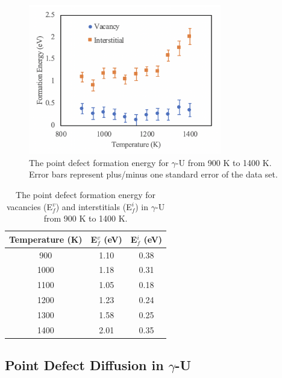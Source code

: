 \documentclass[review]{elsarticle}
\begin{document}
 \begin{figure}[h]
 \centering
 \includegraphics[width=0.75\textwidth]{5_eform.png} 
 \caption{The point defect formation energy for $\gamma$-U from 900 K to 1400 K. Error bars represent plus/minus one standard error of the data set. }
 \label{fig:eform}
\end{figure}

\begin{table}[h]
\caption{The point defect formation energy for vacancies (E$_{f}^{v}$) and interstitials (E$_{f}^{i}$) in $\gamma$-U from 900 K to 1400 K.} \label{tab:defs}
\begin{center}
\begin{tabular}{|c|c|c|}
	\hline
	Temperature (K) & E$_{f}^{v}$ (eV) & E$_{f}^{i}$ (eV) \\
	 \hline
  	   900 & 1.10 & 0.38 \\
	 1000 & 1.18 & 0.31 \\
	 1100 & 1.05 & 0.18 \\
	 1200 & 1.23 & 0.24 \\
	 1300 & 1.58 & 0.25 \\
	 1400 & 2.01 & 0.35 \\
	 \hline
\end{tabular}
\end{center}
\label{default}
\end{table}

\FloatBarrier

\subsection{Point Defect Diffusion in $\gamma$-U}
\end{document}
